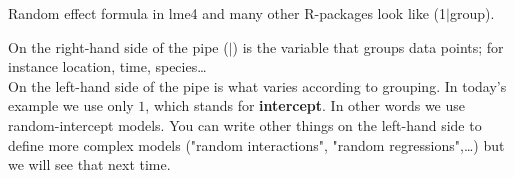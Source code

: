 \documentclass[12pt,a4paper]{scrartcl}\usepackage[]{graphicx}\usepackage[]{color}
\begin{document}
\begin{tcolorbox}[colback=green!5,colframe=green!40!black,title=How does random effect formula work again?]
Random effect formula in lme4 and many other R-packages look like (1$|$group).

On the right-hand side of the pipe ($|$) is the variable that groups data points; for instance location, time, species\dots \\

On the left-hand side of the pipe is what varies according to grouping. In today's example we use only $1$, which stands for \textbf{intercept}. In other words we use random-intercept models. You can write other things on the left-hand side to define more complex models ("random interactions", "random regressions",\dots) but we will see that next time.

\end{tcolorbox}
\end{document}
